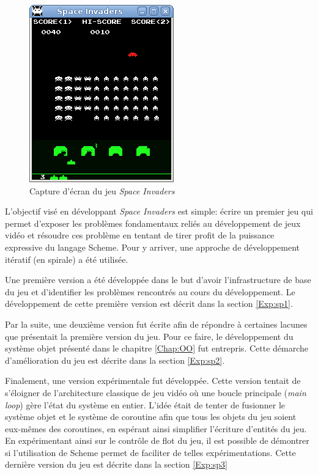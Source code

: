 \documentclass[12pt,oneside,letterpaper,francais]{book}
\newcommand{\si}{{\textit{Space Invaders }}}
\begin{document}
\begin{figure}[htb!]
  \center
  \includegraphics[scale=0.7]{space-invaders-screenshot}
  \caption{Capture d'écran du jeu \si}
  \label{Exp:si-screen}
\end{figure}

L'objectif visé en développant \si est simple: écrire un premier jeu
qui permet d'exposer les problèmes fondamentaux reliés au
développement de jeux vidéo et résoudre ces problème en tentant de
tirer profit de la puissance expressive du langage Scheme. Pour y
arriver, une approche de développement itératif (en spirale) a été
utilisée.

Une première version a été développée dans le but d'avoir
l'infrastructure de base du jeu et d'identifier les problèmes
rencontrés au cours du développement. Le développement de cette
première version est décrit dans la section \ref{Exp:sp1}.

Par la suite, une deuxième version fut écrite afin de répondre à
certaines lacunes que présentait la première version du jeu. Pour ce
faire, le développement du système objet présenté dans le chapitre
\ref{Chap:OO} fut entrepris. Cette démarche d'amélioration du jeu est
décrite dans la section \ref{Exp:sp2}.

Finalement, une version expérimentale fut développée. Cette version
tentait de s'éloigner de l'architecture classique de jeu vidéo où une
boucle principale (\textit{main loop}) gère l'état du système en
entier. L'idée était de tenter de fusionner le système objet et le
système de coroutine afin que tous les objets du jeu soient eux-mêmes
des coroutines, en espérant ainsi simplifier l'écriture d'entités du
jeu. En expérimentant ainsi sur le contrôle de flot du jeu, il est
possible de démontrer si l'utilisation de Scheme permet de faciliter
de telles expérimentations. Cette dernière version du jeu est décrite
dans la section \ref{Exp:sp3}
\end{document}
